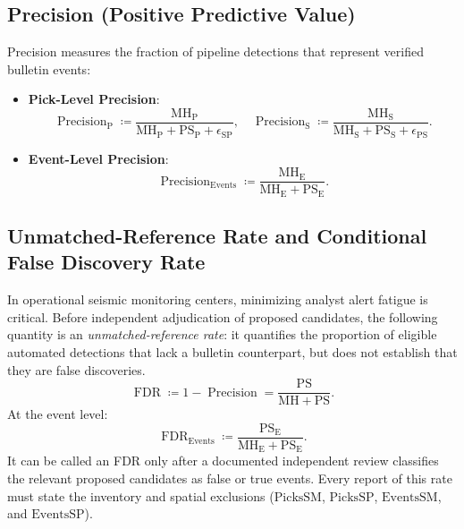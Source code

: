 \subsection{Precision (Positive Predictive Value)}
Precision measures the fraction of pipeline detections that
represent verified bulletin events:
\begin{itemize}
  \item \textbf{Pick-Level Precision}:
    \begin{equation}
      \operatorname{Precision}_{\mathrm{P}} \coloneqq
      \frac{\mathrm{MH}_{\mathrm{P}}}{\mathrm{MH}_{\mathrm{P}} +
      \mathrm{PS}_{\mathrm{P}} + \epsilon_{\mathrm{SP}}}, \quad
      \operatorname{Precision}_{\mathrm{S}} \coloneqq
      \frac{\mathrm{MH}_{\mathrm{S}}}{\mathrm{MH}_{\mathrm{S}} +
      \mathrm{PS}_{\mathrm{S}} + \epsilon_{\mathrm{PS}}}.
    \end{equation}
  \item \textbf{Event-Level Precision}:
    \begin{equation}
      \operatorname{Precision}_{\mathrm{Events}} \coloneqq
      \frac{\mathrm{MH}_{\mathrm{E}}}{\mathrm{MH}_{\mathrm{E}} +
      \mathrm{PS}_{\mathrm{E}}}.
    \end{equation}
\end{itemize}

\subsection{Unmatched-Reference Rate and Conditional False Discovery Rate}
In operational seismic monitoring centers, minimizing analyst alert
fatigue is critical. Before independent adjudication of proposed
candidates, the following quantity is an \emph{unmatched-reference
rate}: it quantifies the proportion of eligible automated detections
that lack a bulletin counterpart, but does not establish that they
are false discoveries.
\begin{equation}
  \operatorname{FDR} \coloneqq 1 - \operatorname{Precision} =
  \frac{\mathrm{PS}}{\mathrm{MH} + \mathrm{PS}}.
\end{equation}
At the event level:
\begin{equation}
  \operatorname{FDR}_{\mathrm{Events}} \coloneqq
  \frac{\mathrm{PS}_{\mathrm{E}}}{\mathrm{MH}_{\mathrm{E}} +
  \mathrm{PS}_{\mathrm{E}}}.
\end{equation}
It can be called an \ac{FDR} only after a documented independent review
classifies the relevant proposed candidates as false or true events.
Every report of this rate must state the inventory and spatial
exclusions ($\mathrm{PicksSM}$, $\mathrm{PicksSP}$,
$\mathrm{EventsSM}$, and $\mathrm{EventsSP}$).

